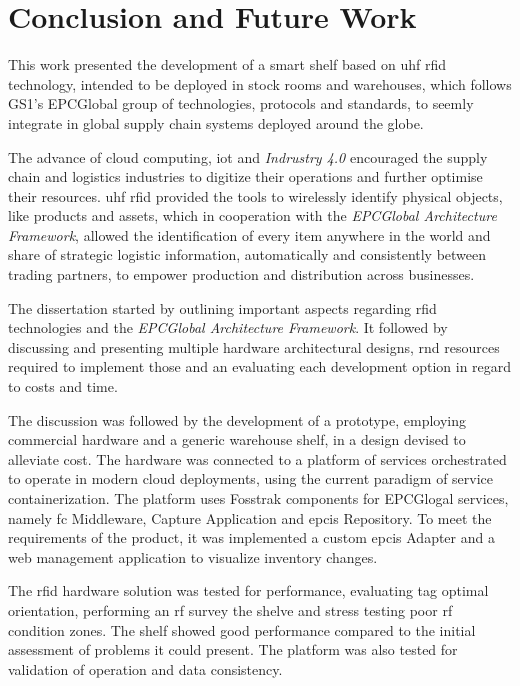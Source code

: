 \chapter{Conclusion and Future Work} \label{sec:conclusion}


This work presented the development of a smart shelf based on \ac{uhf} \ac{rfid} technology, intended to be deployed in stock rooms and warehouses, which follows GS1's EPCGlobal group of technologies, protocols and standards, to seemly integrate in global supply chain systems deployed around the globe.

The advance of cloud computing, \ac{iot} and \emph{Indrustry 4.0} encouraged the supply chain and logistics industries to digitize their operations and further optimise their resources. 
\ac{uhf} \ac{rfid} provided the tools to wirelessly identify physical objects, like products and assets, which in cooperation with the \emph{EPCGlobal Architecture Framework}, allowed the identification of every item anywhere in the world and share of strategic logistic information, automatically and consistently between trading partners, to empower production and distribution across businesses.

The dissertation started by outlining important aspects regarding \ac{rfid} technologies and the \emph{EPCGlobal Architecture Framework}.
It followed by discussing and presenting multiple hardware architectural designs, \ac{rnd} resources required to implement those and an evaluating each development option in regard to costs and time.

The discussion was followed by the development of a prototype, employing commercial hardware and a generic warehouse shelf, in a design devised to alleviate cost. The hardware was connected to a platform of services orchestrated to operate in modern cloud deployments, using the current paradigm of service containerization. 
The platform uses Fosstrak components for EPCGlogal services, namely \ac{fc} Middleware, Capture Application and \ac{epcis} Repository. 
To meet the requirements of the product, it was implemented a custom \ac{epcis} Adapter and a web management application to visualize inventory changes.

The \ac{rfid} hardware solution was tested for performance, evaluating tag optimal orientation, performing an \ac{rf} survey the shelve and stress testing poor \ac{rf} condition zones. The shelf showed good performance compared to the initial assessment of problems it could present.
The platform was also tested for validation of operation and data consistency.

